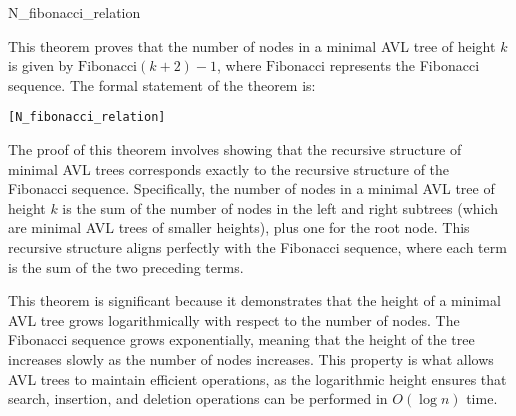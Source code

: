    \begin{thm}{N\_fibonacci\_relation}

    This theorem proves that the number of nodes in a minimal AVL tree of height \( k \) is given by \( \text{Fibonacci}(k+2) - 1 \), where \( \text{Fibonacci} \) represents the Fibonacci sequence. The formal statement of the theorem is:

    \begin{alltt}
    	[N_fibonacci_relation]
    \end{alltt}
    
    \end{thm}
    The proof of this theorem involves showing that the recursive structure of minimal AVL trees corresponds exactly to the recursive structure of the Fibonacci sequence. Specifically, the number of nodes in a minimal AVL tree of height \( k \) is the sum of the number of nodes in the left and right subtrees (which are minimal AVL trees of smaller heights), plus one for the root node. This recursive structure aligns perfectly with the Fibonacci sequence, where each term is the sum of the two preceding terms.

    This theorem is significant because it demonstrates that the height of a minimal AVL tree grows logarithmically with respect to the number of nodes. The Fibonacci sequence grows exponentially, meaning that the height of the tree increases slowly as the number of nodes increases. This property is what allows AVL trees to maintain efficient operations, as the logarithmic height ensures that search, insertion, and deletion operations can be performed in \( O(\log n) \) time.

